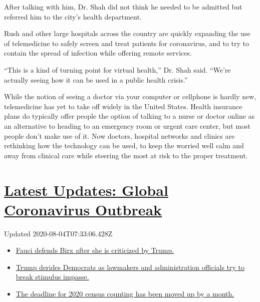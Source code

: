 After talking with him, Dr. Shah did not think he needed to be admitted
but referred him to the city's health department.

Rush and other large hospitals across the country are quickly expanding
the use of telemedicine to safely screen and treat patients for
coronavirus, and to try to contain the spread of infection while
offering remote services.

``This is a kind of turning point for virtual health,'' Dr. Shah said.
``We're actually seeing how it can be used in a public health crisis.''

While the notion of seeing a doctor via your computer or cellphone is
hardly new, telemedicine has yet to take off widely in the United
States. Health insurance plans do typically offer people the option of
talking to a nurse or doctor online as an alternative to heading to an
emergency room or urgent care center, but most people don't make use of
it. Now doctors, hospital networks and clinics are rethinking how the
technology can be used, to keep the worried well calm and away from
clinical care while steering the most at risk to the proper treatment.

\hypertarget{latest-updates-global-coronavirus-outbreak}{%
\section{\texorpdfstring{\href{https://www.nytimes3xbfgragh.onion/2020/08/03/world/coronavirus-covid-19.html?action=click\&pgtype=Article\&state=default\&region=MAIN_CONTENT_1\&context=storylines_live_updates}{Latest
Updates: Global Coronavirus
Outbreak}}{Latest Updates: Global Coronavirus Outbreak}}\label{latest-updates-global-coronavirus-outbreak}}

Updated 2020-08-04T07:33:06.428Z

\begin{itemize}
\tightlist
\item
  \href{https://www.nytimes3xbfgragh.onion/2020/08/03/world/coronavirus-covid-19.html?action=click\&pgtype=Article\&state=default\&region=MAIN_CONTENT_1\&context=storylines_live_updates\#link-4547638f}{Fauci
  defends Birx after she is criticized by Trump.}
\item
  \href{https://www.nytimes3xbfgragh.onion/2020/08/03/world/coronavirus-covid-19.html?action=click\&pgtype=Article\&state=default\&region=MAIN_CONTENT_1\&context=storylines_live_updates\#link-15e7f995}{Trump
  derides Democrats as lawmakers and administration officials try to
  break stimulus impasse.}
\item
  \href{https://www.nytimes3xbfgragh.onion/2020/08/03/world/coronavirus-covid-19.html?action=click\&pgtype=Article\&state=default\&region=MAIN_CONTENT_1\&context=storylines_live_updates\#link-e5a2cda}{The
  deadline for 2020 census counting has been moved up by a month.}
\end{itemize}

